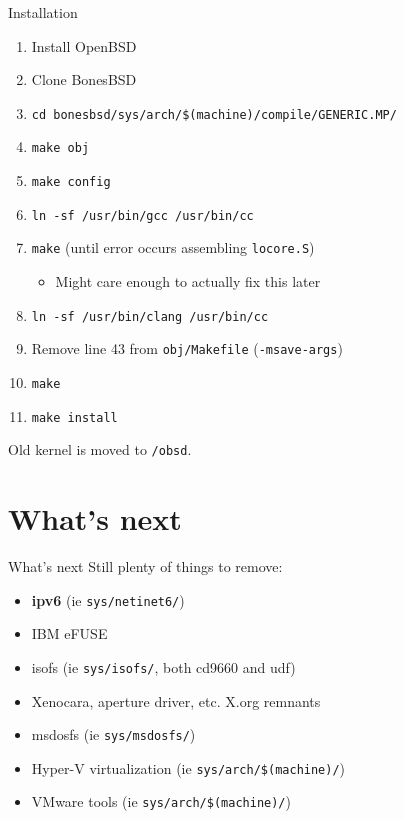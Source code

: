 \documentclass{beamer}
\begin{document}
\setlength{\parskip}{\baselineskip}

\begin{frame}{Installation}
	\begin{enumerate}
		\item Install OpenBSD
		\item Clone BonesBSD
		\item \texttt{cd bonesbsd/sys/arch/\$(machine)/compile/GENERIC.MP/}
		\item \texttt{make obj}
		\item \texttt{make config}
		\item \texttt{ln -sf /usr/bin/gcc /usr/bin/cc}
		\item \texttt{make} (until error occurs assembling \texttt{locore.S})
		\begin{itemize}
			\item Might care enough to actually fix this later
		\end{itemize}
		\item \texttt{ln -sf /usr/bin/clang /usr/bin/cc}
		\item Remove line 43 from \texttt{obj/Makefile} (\texttt{-msave-args})
		\item \texttt{make}
		\item \texttt{make install}
	\end{enumerate}
	Old kernel is moved to \texttt{/obsd}.
\end{frame}

\section{What's next}

\begin{frame}{What's next}
	Still plenty of things to remove:
	\begin{itemize}
		\item \textbf{ipv6} (ie \texttt{sys/netinet6/})
		\item IBM eFUSE
		\item isofs (ie \texttt{sys/isofs/}, both cd9660 and udf)
		\item Xenocara, aperture driver, etc. X.org remnants
		\item msdosfs (ie \texttt{sys/msdosfs/})
		\item Hyper-V virtualization (ie \texttt{sys/arch/\$(machine)/})
		\item VMware tools (ie \texttt{sys/arch/\$(machine)/})
	\end{itemize}
\end{frame}
\end{document}
